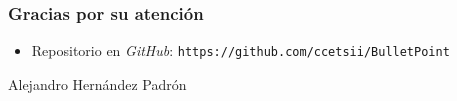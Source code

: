 \begin{frame} [fragile]
  \frametitle{Gracias por su atención}
  \block{\ULLAR}
    \begin{itemize}
    \item Repositorio en {\it GitHub}: \texttt{https://github.com/ccetsii/BulletPoint}
    \end{itemize}
    \begin{flushright}
    Alejandro Hernández Padrón  \\
    \end{flushright}
  \endblock{}
\end{frame}